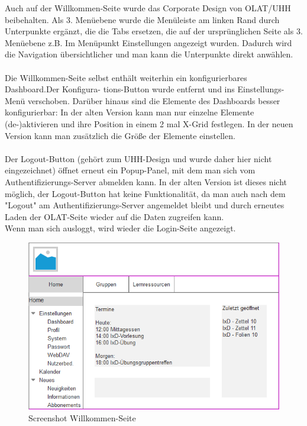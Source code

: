\documentclass[a4paper,10pt]{article}
\begin{document}
\begin{enumerate}
\begin{enumerate}
Auch auf der Willkommen-Seite wurde das Corporate Design von OLAT/UHH beibehalten. Als 3. Menüebene wurde die Menüleiste am linken Rand durch Unterpunkte ergänzt, die die Tabs ersetzen, die auf der ursprünglichen Seite als 3. Menüebene z.B. Im Menüpunkt Einstellungen angezeigt wurden. Dadurch wird die Navigation übersichtlicher und man kann die Unterpunkte direkt anwählen.\\\\
Die Willkommen-Seite selbst enthält weiterhin ein konfigurierbares Dashboard.Der Konfigura- tions-Button wurde entfernt und ins Einstellungs-Menü verschoben. Darüber hinaus sind die Elemente des Dashboards besser konfigurierbar:  In der alten Version kann man nur einzelne Elemente (de-)aktivieren und ihre Position in einem 2 mal X-Grid festlegen. In der neuen Version kann man zusätzlich die Größe der Elemente einstellen.\\\\
Der Logout-Button (gehört zum UHH-Design und wurde daher hier nicht eingezeichnet) öffnet erneut ein Popup-Panel, mit dem man sich vom Authentifizierungs-Server abmelden kann. In der alten Version ist dieses nicht möglich, der Logout-Button hat keine Funktionalität, da man auch nach dem "Logout" am Authentifizierungs-Server angemeldet bleibt und durch erneutes Laden der OLAT-Seite wieder auf die Daten zugreifen kann.\\
Wenn man sich ausloggt, wird wieder die Login-Seite angezeigt.
\begin{figure}[H]
	\centering
	\includegraphics[width=1.0\textwidth]{Screenshot-Willkommen.png} 
	\caption{Screenshot Willkommen-Seite}
	\label{fig1}
\end{figure}
\begin{figure}[H]

\end{figure}
\end{enumerate}
\end{enumerate}
\end{document}
